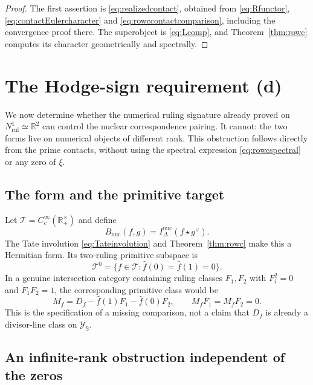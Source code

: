 \documentclass[11pt]{amsart}
\theoremstyle{definition}
\theoremstyle{remark}
\begin{document}
\begin{proof}
The first assertion is \eqref{eq:realizedcontact}, obtained from
\eqref{eq:Rfunctor}, \eqref{eq:contactEulercharacter} and
\eqref{eq:rowccontactcomparison}, including the convergence proof there.
The superobject is \eqref{eq:Lcomp}, and Theorem~\ref{thm:rowc} computes
its character geometrically and spectrally.
\end{proof}


\section{The Hodge-sign requirement (d)}
\label{sec:rowdgate}

We now determine whether the numerical ruling signature already proved on
$N^1_{\mathrm{rul}}\simeq\mathbb R^2$ can control the nuclear correspondence
pairing.  It cannot: the two forms live on numerical objects of different
rank.  This obstruction follows directly from the prime contacts, without
using the spectral expression \eqref{eq:rowcspectral} or any zero of $\xi$.

\subsection{The form and the primitive target}

Let $\mathcal T=C_c^\infty(\mathbb R_+^\times)$ and define
\begin{equation}\label{eq:Bnuc}
 B_{\mathrm{nuc}}(f,g)=I_\Delta^{\mathrm{nuc}}(f\star g^\vee).
\end{equation}
The Tate involution \eqref{eq:Tateinvolution} and
Theorem~\ref{thm:rowc} make this a Hermitian form.  Its two-ruling primitive
subspace is
\begin{equation}\label{eq:twoprimitive}
 \mathcal T^0=\{f\in\mathcal T:
                  \widehat f(0)=\widehat f(1)=0\}.
\end{equation}
In a genuine intersection category containing ruling classes $F_1,F_2$ with
$F_i^2=0$ and $F_1F_2=1$, the corresponding primitive class would be
\begin{equation}\label{eq:requiredprimitiveclass}
 M_f=D_f-\widehat f(1)F_1-\widehat f(0)F_2,
 \qquad M_fF_1=M_fF_2=0.
\end{equation}
This is the specification of a missing comparison, not a claim that $D_f$
is already a divisor-line class on $\mathscr Y_{\mathbb S}$.

\subsection{An infinite-rank obstruction independent of the zeros}
\end{document}
